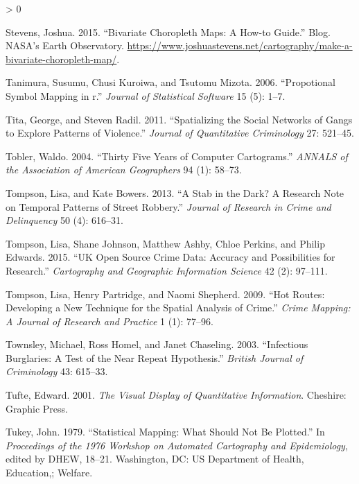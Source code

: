 \documentclass[
  krantz2]{krantz}
\newlength{\cslhangindent}
\newenvironment{CSLReferences}[2] %
 {%
  \setlength{\parindent}{0pt}
  \ifodd #1 \everypar{\setlength{\hangindent}{\cslhangindent}}\ignorespaces\fi
  \ifnum #2 > 0
  \setlength{\parskip}{#2\baselineskip}
  \fi
 }%
 {}
\begin{document}
\begin{CSLReferences}{1}{0}
\leavevmode\hypertarget{ref-Stevens_2015}{}%
Stevens, Joshua. 2015. {``Bivariate Choropleth Maps: A How-to Guide.''} Blog. NASA's Earth Observatory. \url{https://www.joshuastevens.net/cartography/make-a-bivariate-choropleth-map/}.

\leavevmode\hypertarget{ref-Tanimura_2006}{}%
Tanimura, Susumu, Chusi Kuroiwa, and Tsutomu Mizota. 2006. {``Propotional Symbol Mapping in r.''} \emph{Journal of Statistical Software} 15 (5): 1--7.

\leavevmode\hypertarget{ref-Tita_2011}{}%
Tita, George, and Steven Radil. 2011. {``Spatializing the Social Networks of Gangs to Explore Patterns of Violence.''} \emph{Journal of Quantitative Criminology} 27: 521--45.

\leavevmode\hypertarget{ref-Tobler_2004}{}%
Tobler, Waldo. 2004. {``Thirty Five Years of Computer Cartograms.''} \emph{ANNALS of the Association of American Geographers} 94 (1): 58--73.

\leavevmode\hypertarget{ref-Tompson_2013}{}%
Tompson, Lisa, and Kate Bowers. 2013. {``A Stab in the Dark? A Research Note on Temporal Patterns of Street Robbery.''} \emph{Journal of Research in Crime and Delinquency} 50 (4): 616--31.

\leavevmode\hypertarget{ref-Tompson_2015}{}%
Tompson, Lisa, Shane Johnson, Matthew Ashby, Chloe Perkins, and Philip Edwards. 2015. {``UK Open Source Crime Data: Accuracy and Possibilities for Research.''} \emph{Cartography and Geographic Information Science} 42 (2): 97--111.

\leavevmode\hypertarget{ref-Tompson_2009}{}%
Tompson, Lisa, Henry Partridge, and Naomi Shepherd. 2009. {``Hot Routes: Developing a New Technique for the Spatial Analysis of Crime.''} \emph{Crime Mapping: A Journal of Research and Practice} 1 (1): 77--96.

\leavevmode\hypertarget{ref-Townsley_2003}{}%
Townsley, Michael, Ross Homel, and Janet Chaseling. 2003. {``Infectious Burglaries: A Test of the Near Repeat Hypothesis.''} \emph{British Journal of Criminology} 43: 615--33.

\leavevmode\hypertarget{ref-Tufte_2001}{}%
Tufte, Edward. 2001. \emph{The Visual Display of Quantitative Information}. Cheshire: Graphic Press.

\leavevmode\hypertarget{ref-Tukey_1979}{}%
Tukey, John. 1979. {``Statistical Mapping: What Should Not Be Plotted.''} In \emph{Proceedings of the 1976 Workshop on Automated Cartography and Epidemiology}, edited by DHEW, 18--21. Washington, DC: US Department of Health, Education,; Welfare.


\end{CSLReferences}
\end{document}
